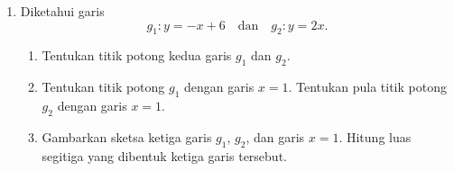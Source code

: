 \documentclass[10pt,letterpaper]{article}
\begin{document}
\begin{enumerate}
  \item Diketahui garis
        \[
          g_1:y=-x+6\quad\text{dan}\quad g_2:y=2x.
        \]
        \begin{enumerate}
          \item Tentukan titik potong kedua garis $g_1$ dan $g_2$.
          \item Tentukan titik potong $g_1$ dengan garis $x=1$.
                Tentukan pula titik potong $g_2$ dengan garis $x=1$.
          \item Gambarkan sketsa ketiga garis $g_1$, $g_2$, dan garis $x=1$.
                Hitung luas segitiga yang dibentuk ketiga garis tersebut.
        \end{enumerate}

\end{enumerate}
\end{document}
